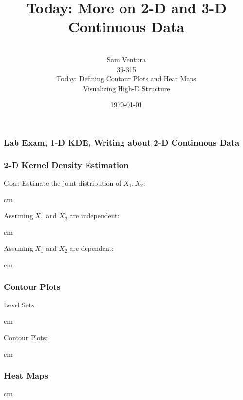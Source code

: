 \documentclass{beamer} %
\begin{document}
\title[dedup]{Today:  More on 2-D and 3-D Continuous Data}


\author[Samuel L. Ventura]{\\
  \large{Sam Ventura\\36-315\\Today:  Defining Contour Plots and Heat Maps\\Visualizing High-D Structure}}
\date{\today}


\begin{frame}
	\maketitle
	
	
\end{frame}



\begin{frame}\frametitle{Lab Exam, 1-D KDE, Writing about 2-D Continuous Data}
	
	
\end{frame}



\begin{frame}\frametitle{2-D Kernel Density Estimation}
	\small
	
	Goal:  Estimate the joint distribution of $X_1, X_2$:
	
	 cm
	
	Assuming $X_1$ and $X_2$ are independent:
	
	 cm
	
	Assuming $X_1$ and $X_2$ are dependent:
	
	 cm
	
\end{frame}


\begin{frame}\frametitle{Contour Plots}
	\small
	
	Level Sets:
	
	 cm
	
	Contour Plots:
	
	 cm
	
\end{frame}


\begin{frame}\frametitle{Heat Maps}
	\small
	
	
	 cm
	
\end{frame}
\end{document}
